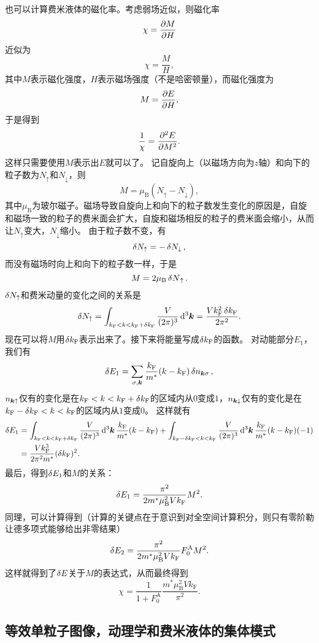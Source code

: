 也可以计算费米液体的磁化率。考虑弱场近似，则磁化率
\[
    \chi = \pdv{M}{H}
\]
近似为
\[
    \chi = \frac{M}{H},
\]
其中$M$表示磁化强度，$H$表示磁场强度（不是哈密顿量），而磁化强度为
\[
    M = \pdv{E}{H},
\]
于是得到
\[
    \frac{1}{\chi} = \pdv[2]{E}{M}.
\]
这样只需要使用$M$表示出$E$就可以了。
记自旋向上（以磁场方向为$z$轴）和向下的粒子数为$N_\uparrow$和$N_\downarrow$，则
\[
    M = \mu_\text{B} (N_\uparrow - N_\downarrow),
\]
其中$\mu_\text{B}$为玻尔磁子。磁场导致自旋向上和向下的粒子数发生变化的原因是，自旋和磁场一致的粒子的费米面会扩大，自旋和磁场相反的粒子的费米面会缩小，从而让$N_\uparrow$变大，$N_\downarrow$缩小。
由于粒子数不变，有
\[
    \var{N_\uparrow} = - \var{N_\downarrow},
\]
而没有磁场时向上和向下的粒子数一样，于是
\[
    M = 2 \mu_\text{B} \var{N}_\uparrow.
\]
$\var{N_\uparrow}$和费米动量的变化之间的关系是
\[
    \var{N_\uparrow} = \int_{k_\text{F} < k < k_\text{F} + \var{k_\text{F}}} \frac{V}{(2\pi)^3} \dd[3]{\vb*{k}} = \frac{V k_\text{F}^2 \var{k_\text{F}}}{2\pi^2}.
\]
现在可以将$M$用$\var{k_\text{F}}$表示出来了。接下来将能量写成$\var{k_\text{F}}$的函数。
对动能部分$E_1$，我们有
\[
    \var{E_1} = \sum_{\sigma, \vb*{k}} \frac{k_\text{F}}{m^*} (k - k_\text{F}) \var{n}_{\vb*{k} \sigma},
\]
$n_{\vb*{k} \uparrow}$仅有的变化是在$k_\text{F} < k < k_\text{F} + \var{k_\text{F}}$的区域内从$0$变成$1$，$n_{\vb*{k} \downarrow}$仅有的变化是在$k_\text{F} - \var{k_\text{F}} < k < k_\text{F}$的区域内从$1$变成$0$。
这样就有
\[
    \begin{aligned}
        \var{E_1} &= \int_{k_\text{F} < k < k_\text{F} + \var{k_\text{F}}} \frac{V}{(2\pi)^3} \dd[3]{\vb*{k}} \frac{k_\text{F}}{m^*} (k - k_\text{F}) + \int_{k_\text{F} - \var{k_\text{F}} < k < k_\text{F}} \frac{V}{(2\pi)^3} \dd[3]{\vb*{k}} \frac{k_\text{F}}{m^*} (k - k_\text{F}) (-1) \\
        &= \frac{V k_\text{F}^3}{2 \pi^2 m^*} (\var{k_\text{F}})^2.
    \end{aligned}
\]
最后，得到$\var{E_1}$和$M$的关系：
\[
    \var{E_1} = \frac{\pi^2}{2 m^* \mu_\text{B}^2 V k_\text{F}} M^2.
\]
同理，可以计算得到（计算的关键点在于意识到对全空间计算积分，则只有零阶勒让德多项式能够给出非零结果）
\[
    \var{E_2} = \frac{\pi^2}{2 m^* \mu_\text{B}^2 V k_\text{F}} F_0^\text{A} M^2.
\]
这样就得到了$\var{E}$关于$M$的表达式，从而最终得到
\begin{equation}
    \chi = \frac{1}{1 + F_0^\text{A}} \frac{m^* \mu_\text{B}^2 V k_\text{F}}{\pi^2}.
\end{equation}

\subsection{等效单粒子图像，动理学和费米液体的集体模式}

